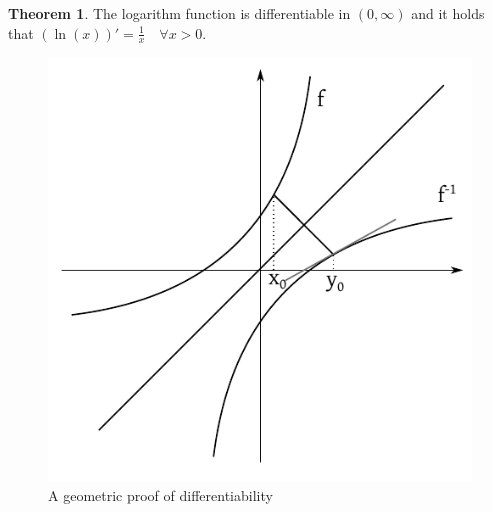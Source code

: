 \documentclass[a4paper,landscape,twocolumn]{article}
\theoremstyle{definition}
\newtheorem{theorem}{Theorem}
\begin{document}
\begin{theorem}
  The logarithm function is differentiable in $(0,\infty)$ and it holds that $(\ln(x))' = \frac1x \quad \forall x > 0$.
\end{theorem}
\begin{figure}[!h]
  \begin{center}
    \includegraphics{img/geometric-exp-proof.pdf}
    \caption{A geometric proof of differentiability}
    \label{img:geo-diff}
  \end{center}
\end{figure}
\end{document}
